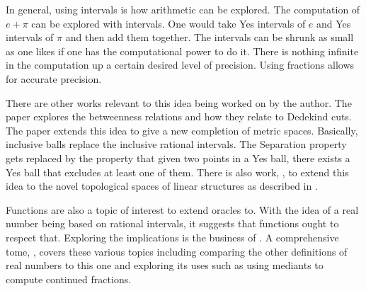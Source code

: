 \documentclass[12pt]{article}
\begin{document}
In general, using intervals is how arithmetic can be explored. The computation of $e + \pi$ can be explored with intervals. One would take Yes intervals of $e$ and Yes intervals of $\pi$ and then add them together. The intervals can be shrunk as small as one likes if one has the computational power to do it. There is nothing infinite in the computation up a certain desired level of precision. Using fractions allows for accurate precision. 

There are other works relevant to this idea being worked on by the author. The paper \cite{taylor24dedekind} explores the betweenness relations and how they relate to Dedekind cuts. The paper \cite{taylor23metric} extends this idea to give a new completion of metric spaces. Basically, inclusive balls replace the inclusive rational intervals. The Separation property gets replaced by the property that given two points in a Yes ball, there exists a Yes ball that excludes at least one of them. There is also work, \cite{taylor23maudlin}, to extend this idea to the novel topological spaces of linear structures as described in \cite{maudlin}. 

Functions are also a topic of interest to extend oracles to. With the idea of a real number being based on rational intervals, it suggests that functions ought to respect that. Exploring the implications is the business of \cite{taylor23funora}. A comprehensive tome, \cite{taylor23main}, covers these various topics including comparing the other definitions of real numbers to this one and exploring its uses such as using mediants to compute continued fractions. 

\medskip

\normalem %

\printbibliography
\end{document}
